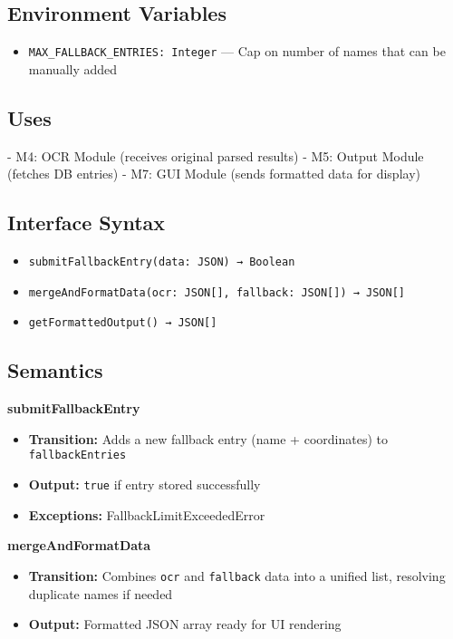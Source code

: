 \documentclass[12pt, titlepage]{article}
\begin{document}
\subsection*{Environment Variables}
\begin{itemize}
  \item \texttt{MAX\_FALLBACK\_ENTRIES: Integer} — Cap on number of names that can be manually added  
\end{itemize}

\subsection*{Uses}
- M4: OCR Module (receives original parsed results)  
- M5: Output Module (fetches DB entries)  
- M7: GUI Module (sends formatted data for display)

\subsection*{Interface Syntax}
\begin{itemize}
  \item \texttt{submitFallbackEntry(data: JSON) → Boolean}  
  \item \texttt{mergeAndFormatData(ocr: JSON[], fallback: JSON[]) → JSON[]}  
  \item \texttt{getFormattedOutput() → JSON[]}
\end{itemize}

\subsection*{Semantics}

\textbf{submitFallbackEntry}
\begin{itemize}
  \item \textbf{Transition:} Adds a new fallback entry (name + coordinates) to \texttt{fallbackEntries}
  \item \textbf{Output:} \texttt{true} if entry stored successfully  
  \item \textbf{Exceptions:} FallbackLimitExceededError
\end{itemize}

\textbf{mergeAndFormatData}
\begin{itemize}
  \item \textbf{Transition:} Combines \texttt{ocr} and \texttt{fallback} data into a unified list, resolving duplicate names if needed  
  \item \textbf{Output:} Formatted JSON array ready for UI rendering  
\end{itemize}
\end{document}
